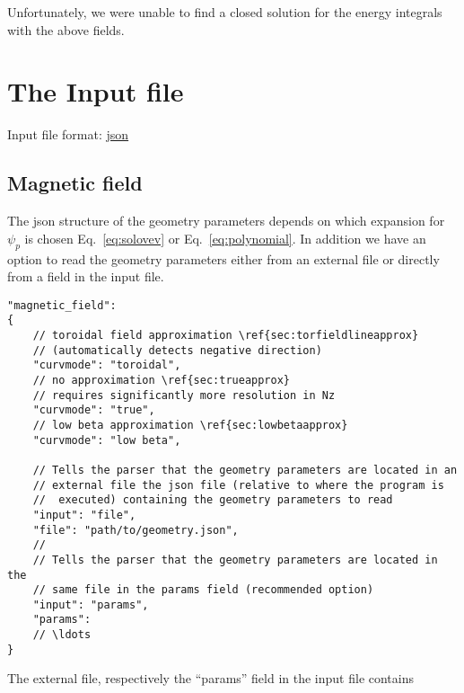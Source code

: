 Unfortunately, we were unable to find a closed solution for the energy integrals with the above fields.

\section{The Input file} \label{sec:input_file}
Input file format: \href{https://en.wikipedia.org/wiki/JSON}{json}

\subsection{Magnetic field} \label{sec:geometry_file}

The json structure of the geometry parameters depends on which expansion for $\psi_p$ is chosen Eq.~\eqref{eq:solovev} or Eq.~\eqref{eq:polynomial}.
In addition we have an option to read the geometry parameters either from an external
file or directly from a field in the input file.
\begin{verbatim}
"magnetic_field":
{
    // toroidal field approximation \ref{sec:torfieldlineapprox}
    // (automatically detects negative direction)
    "curvmode": "toroidal",
    // no approximation \ref{sec:trueapprox}
    // requires significantly more resolution in Nz
    "curvmode": "true",
    // low beta approximation \ref{sec:lowbetaapprox}
    "curvmode": "low beta",

    // Tells the parser that the geometry parameters are located in an
    // external file the json file (relative to where the program is
    //  executed) containing the geometry parameters to read
    "input": "file",
    "file": "path/to/geometry.json",
    //
    // Tells the parser that the geometry parameters are located in the
    // same file in the params field (recommended option)
    "input": "params",
    "params":
    // \ldots
}
\end{verbatim}
\noindent
The external file, respectively the ``params'' field in the input file
contains
